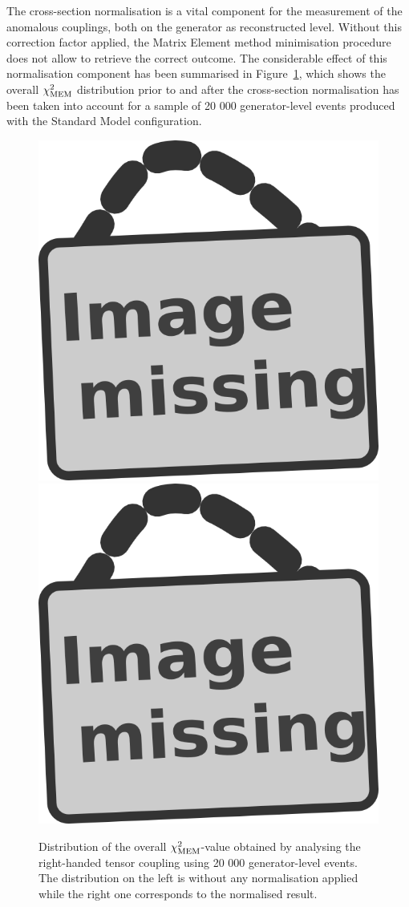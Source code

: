 The cross-section normalisation is a vital component for the measurement of the anomalous couplings, both on the generator as reconstructed level. Without this correction factor applied, the Matrix Element method minimisation procedure does not allow to retrieve the correct outcome. The considerable effect of this normalisation component has been summarised in Figure~\ref{fig::XSInflGen}, which shows the overall $\chi^{2}_{\textrm{MEM}}$ distribution prior to and after the cross-section normalisation has been taken into account for a sample of 20 000 generator-level events produced with the Standard Model configuration.
\begin{figure}[h!t]
 \centering
 \includegraphics[width = 0.3 \textwidth]{image.png} \hspace{0.5cm}
 \includegraphics[width = 0.3 \textwidth]{image.png}
 \caption{Distribution of the overall $\chi^{2}_{\textrm{MEM}}$-value obtained by analysing the right-handed tensor coupling using 20 000 generator-level events. The distribution on the left is without any normalisation applied while the right one corresponds to the normalised result.} \label{fig::XSInflGen}
\end{figure}

